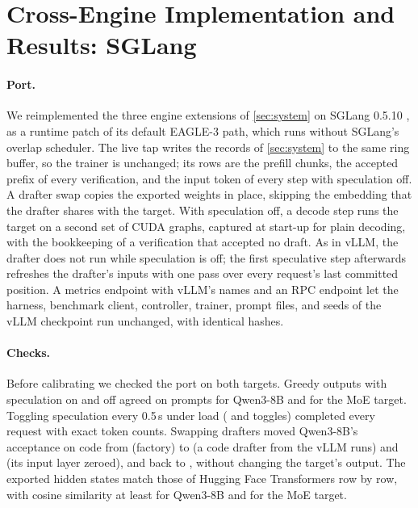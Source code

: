 \section{Cross-Engine Implementation and Results: SGLang}\label{app:sglang}

\paragraph{Port.} We reimplemented the three engine extensions of \cref{sec:system} on SGLang 0.5.10 \citep{zheng2024sglang}, as a runtime patch of its default EAGLE-3 path, which runs without SGLang's overlap scheduler. The live tap writes the records of \cref{sec:system} to the same ring buffer, so the trainer is unchanged; its rows are the prefill chunks, the accepted prefix of every verification, and the input token of every step with speculation off. A drafter swap copies the exported weights in place, skipping the embedding that the drafter shares with the target. With speculation off, a decode step runs the target on a second set of CUDA graphs, captured at start-up for plain decoding, with the bookkeeping of a verification that accepted no draft. As in vLLM, the drafter does not run while speculation is off; the first speculative step afterwards refreshes the drafter's inputs with one pass over every request's last committed position. A metrics endpoint with vLLM's names and an RPC endpoint let the harness, benchmark client, controller, trainer, prompt files, and seeds of the vLLM checkpoint run unchanged, with identical hashes.

\paragraph{Checks.} Before calibrating we checked the port on both targets. Greedy outputs with speculation on and off agreed on  prompts for Qwen3-8B and  for the MoE target. Toggling speculation every 0.5\,s under load ( and  toggles) completed every request with exact token counts. Swapping drafters moved Qwen3-8B's acceptance on code from  (factory) to  (a code drafter from the vLLM runs) and  (its input layer zeroed), and back to , without changing the target's output. The exported hidden states match those of Hugging Face Transformers row by row, with cosine similarity at least  for Qwen3-8B and  for the MoE target.

